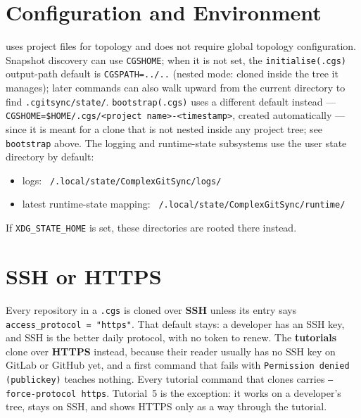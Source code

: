 

\section{Configuration and Environment}

\cgspkg{} uses project files for topology and does not require global topology
configuration. Snapshot discovery can use \texttt{CGSHOME}; when it is not set,
the \texttt{initialise(.cgs)} output-path default is \texttt{CGSPATH=../..}
(nested mode: \cgspkg{} cloned inside the tree it manages); later
commands can also walk upward from the current directory to find
\texttt{.cgitsync/state/}. \texttt{bootstrap(.cgs)} uses a different
default instead --- \texttt{CGSHOME=\$HOME/.cgs/<project name>-<timestamp>},
created automatically --- since it is meant for a \cgspkg{} clone that is not
nested inside any project tree; see \texttt{bootstrap} above. The logging
and runtime-state subsystems use the user state directory by default:

\begin{itemize}
  \item logs: \texttt{~/.local/state/ComplexGitSync/logs/}
  \item latest runtime-state mapping:
        \texttt{~/.local/state/ComplexGitSync/runtime/}
\end{itemize}

If \texttt{XDG\_STATE\_HOME} is set, these directories are rooted there
instead.

\section{SSH or HTTPS}
\label{sec:ssh-or-https}

Every repository in a \texttt{.cgs} is cloned over \textbf{SSH} unless its
entry says \texttt{access\_protocol = "https"}. That default stays: a
developer has an SSH key, and SSH is the better daily protocol, with no token
to renew. The \textbf{tutorials} clone over \textbf{HTTPS} instead, because
their reader usually has no SSH key on GitLab or GitHub yet, and a first
command that fails with \texttt{Permission denied (publickey)} teaches
nothing. Every tutorial command that clones carries \texttt{--force-protocol
https}. Tutorial~5 is the exception: it works on a developer's tree, stays on
SSH, and shows HTTPS only as a way through the tutorial.

